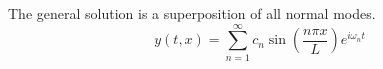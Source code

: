\documentclass[11pt]{article}
\begin{document}
		The general solution is a superposition of all normal modes.
		\begin{equation}
			y(t, x) = \sum_{n=1}^\infty c_n \sin\left( \frac{n\pi x}{L} \right)e^{i\omega_n t}
		\end{equation}

%		
%		


\end{document}
